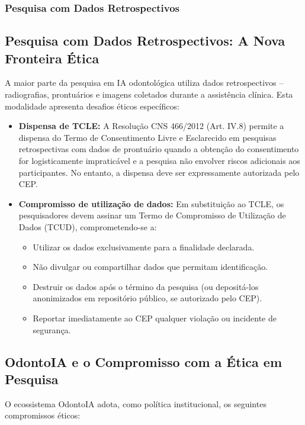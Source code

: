 \subsubsection{Pesquisa com Dados Retrospectivos}

\subsection{Pesquisa com Dados Retrospectivos: A Nova Fronteira Ética}

A maior parte da pesquisa em IA odontológica utiliza dados retrospectivos --
radiografias, prontuários e imagens coletados durante a assistência clínica.
Esta modalidade apresenta desafios éticos específicos:

\begin{itemize}
  \item \textbf{Dispensa de TCLE:} A Resolução CNS 466/2012 (Art. IV.8) permite
    a dispensa do Termo de Consentimento Livre e Esclarecido em pesquisas
    retrospectivas com dados de prontuário quando a obtenção do consentimento
    for logisticamente impraticável e a pesquisa não envolver riscos adicionais
    aos participantes. No entanto, a dispensa deve ser expressamente autorizada
    pelo CEP.

  \item \textbf{Compromisso de utilização de dados:} Em substituição ao TCLE,
    os pesquisadores devem assinar um Termo de Compromisso de Utilização de
    Dados (TCUD), comprometendo-se a:
    \begin{itemize}
      \item Utilizar os dados exclusivamente para a finalidade declarada.
      \item Não divulgar ou compartilhar dados que permitam identificação.
      \item Destruir os dados após o término da pesquisa (ou depositá-los
        anonimizados em repositório público, se autorizado pelo CEP).
      \item Reportar imediatamente ao CEP qualquer violação ou incidente de
        segurança.
    \end{itemize}
\end{itemize}

\subsection{OdontoIA e o Compromisso com a Ética em Pesquisa}

O ecossistema OdontoIA adota, como política institucional, os seguintes
compromissos éticos:

